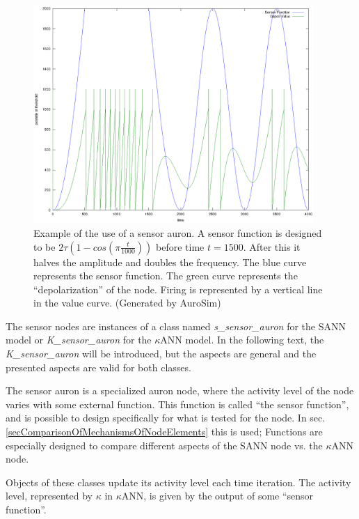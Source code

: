 \begin{figure}[hbt!p]
	\centering
	\includegraphics[width=0.95\textwidth]{sensorAuron}
	\caption{Example of the use of a sensor auron. A sensor function is designed to be \mbox{$2\tau (1-cos(\pi \frac{t}{1000}))$} before time $t=1500$. After this it halves the amplitude and doubles the frequency.
			The blue curve represents the sensor function. The green curve represents the ``depolarization'' of the node. Firing is represented by a vertical line in the value curve.
			(Generated by AuroSim)} 
	\label{figSensorAuronExample}
\end{figure}

	The sensor nodes are instances of a class named \emph{s\_sensor\_auron} for the SANN model or \emph{K\_sensor\_auron} for the $\kappa$ANN model.
	In the following text, the \emph{K\_sensor\_auron} will be introduced, but the aspects are general and the presented aspects are valid for both classes. %

 	The sensor auron is a specialized auron node, where the activity level of the node varies with some external function.
	This function is called ``the sensor function'', and is possible to design specifically for what is tested for the node.
	In sec. \ref{secComparisonOfMechanismsOfNodeElements} this is used;
		Functions are especially designed to compare different aspects of the SANN node vs. the $\kappa$ANN node. %

	Objects of these classes update its activity level each time iteration.
	The activity level, represented by $\kappa$ in $\kappa$ANN, is given by the output of some ``sensor function''.

